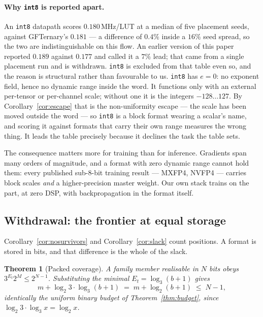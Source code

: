 \documentclass[11pt]{article}
\newtheorem{theorem}{Theorem}
\theoremstyle{definition}
\begin{document}
\paragraph{Why \texttt{int8} is reported apart.}
An \texttt{int8} datapath scores $0.180$\,MHz/LUT at a median of five placement
seeds, against GFTernary's $0.181$ --- a difference of $0.4\%$ inside a $16\%$
seed spread, so the two are indistinguishable on this flow. An earlier version of
this paper reported $0.189$ against $0.177$ and called it a $7\%$ lead; that came
from a single placement run and is withdrawn. \texttt{int8} is excluded from that table even so, and the
reason is structural rather than favourable to us. \texttt{int8} has $e=0$: no exponent field, hence no dynamic
range inside the word. It functions only with an external per-tensor or
per-channel scale; without one it is the integers $-128\ldots127$. By
Corollary~\ref{cor:escape} that is the non-uniformity escape --- the scale has
been moved outside the word --- so \texttt{int8} is a block format wearing a
scalar's name, and scoring it against formats that carry their own range measures
the wrong thing. It leads the table precisely because it declines the task the
table sets.

The consequence matters more for training than for inference. Gradients span many
orders of magnitude, and a format with zero dynamic range cannot hold them: every
published sub-8-bit training result --- MXFP4, NVFP4 --- carries block scales
\emph{and} a higher-precision master weight. Our own stack trains on the part, at
zero DSP, with backpropagation in the format itself.



\subsection{Withdrawal: the frontier at equal storage}
\label{sec:packedfrontier}

Corollary~\ref{cor:nosurvivors} and Corollary~\ref{cor:slack} count positions.
A format is stored in bits, and that difference is the whole of the slack.

\begin{theorem}[Packed coverage]
\label{thm:packedcov}
A family member realisable in $N$ bits obeys $3^{E_t}2^{M} \le 2^{N-1}$.
Substituting the minimal $E_t = \log_3(b+1)$ gives
\[
  m + \log_2 3 \cdot \log_3(b+1) \;=\; m + \log_2(b+1) \;\le\; N-1 ,
\]
identically the uniform binary budget of Theorem~\ref{thm:budget}, since
$\log_2 3 \cdot \log_3 x = \log_2 x$.
\end{theorem}
\end{document}
